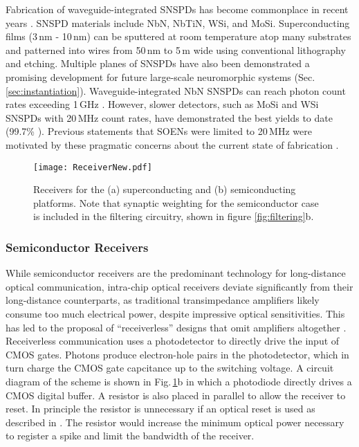 \documentclass[twocolumn]{article}
\begin{document}
Fabrication of waveguide-integrated SNSPDs has become commonplace in recent years \cite{spga2011,pesc2012,akhlaghi2015waveguide,feka2015,saga2015,shbu2017b,ferrari2018waveguide,buta2020}. SNSPD materials include NbN, NbTiN, WSi, and MoSi. Superconducting films (3\,nm - 10\,nm) can be sputtered at room temperature atop many substrates and patterned into wires from 50\,nm to 5\,\textmu m wide using conventional lithography and etching. Multiple planes of SNSPDs have also been demonstrated \cite{vema2012}\textemdash a promising development for future large-scale neuromorphic systems (Sec.\,\ref{sec:instantiation}). Waveguide-integrated NbN SNSPDs can reach photon count rates exceeding 1\,GHz \cite{rosenberg2013high,vetter2016cavity}. However, slower detectors, such as MoSi and WSi SNSPDs with 20\,MHz count rates, have demonstrated the best yields to date (99.7\% \cite{wove2019}). Previous statements that SOENs were limited to 20\,MHz were motivated by these pragmatic concerns about the current state of fabrication \cite{shainline2019superconducting}.

\begin{figure}[!h]
    \centering
    \texttt{[image: ReceiverNew.pdf]}
    \caption{Receivers for the (a) superconducting and (b) semiconducting platforms. Note that synaptic weighting for the semiconductor case is included in the filtering circuitry, shown in figure \ref{fig:filtering}b.}
    \label{fig:sup_synapse}
\end{figure}

\subsubsection{Semiconductor Receivers}
While semiconductor receivers are the predominant technology for long-distance optical communication, intra-chip optical receivers deviate significantly from their long-distance counterparts, as traditional transimpedance amplifiers likely consume too much electrical power, despite impressive optical sensitivities. This has led to the proposal of ``receiverless'' designs that omit amplifiers altogether \cite{miller2017attojoule}. Receiverless communication uses a photodetector to directly drive the input of CMOS gates. Photons produce electron-hole pairs in the photodetector, which in turn charge the CMOS gate capcitance up to the switching voltage. A circuit diagram of the scheme is shown in Fig.\,\ref{fig:sup_synapse}b in which a photodiode directly drives a CMOS digital buffer. A resistor is also placed in parallel to allow the receiver to reset. In principle the resistor is unnecessary if an optical reset is used as described in \cite{debaes2003receiver}. The resistor would increase the minimum optical power necessary to register a spike and limit the bandwidth of the receiver. 
\end{document}
